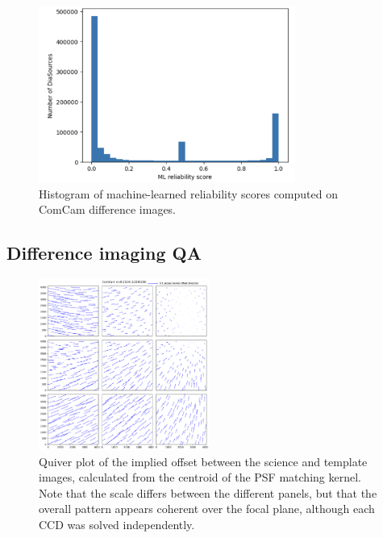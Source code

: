\begin{figure}
  \begin{center}
    \includegraphics[width=0.75\textwidth]{dia/figures/reliability_histogram.png}
  \end{center}
\caption{Histogram of machine-learned reliability scores computed on ComCam difference
  images. \label{fig:reliability_hist}}
\end{figure}

\subsection{Difference imaging QA}

\begin{figure}
  \begin{center}
    \includegraphics[width=0.5\textwidth]{dia/figures/ComCam_kernel_quiver_2024112000208.png}
  \end{center}
\caption{Quiver plot of the implied offset between the science and template images,
  calculated from the centroid of the PSF matching kernel.
  Note that the scale differs between the different panels, but that the overall pattern
  appears coherent over the focal plane, although each CCD was solved independently.
  \label{fig:diffim-quiver}}
\end{figure}

